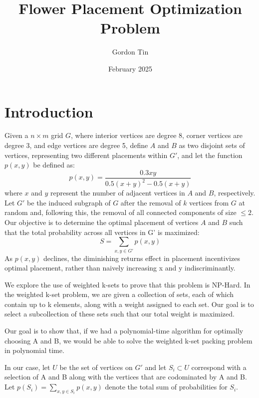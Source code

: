 \documentclass{article}
\title{Flower Placement Optimization Problem}
\author{Gordon Tin}
\date{February 2025}
\begin{document}
\maketitle

\section{Introduction}

Given a $n \times m$ grid $G$, where interior vertices are degree 8, corner vertices are degree 3, and edge vertices are degree 5, define $A$ and $B$ as two disjoint sets of vertices, representing two different placements within $G'$, and let the function $p(x,y)$ be defined as: 
\[p(x,y)= \frac{0.3xy}{0.5(x+y)^{2}-0.5(x+y)}\]
where $x$ and $y$ represent the number of adjacent vertices in $A$ and $B$, respectively. Let $G'$ be the induced subgraph of $G$ after the removal of $k$ vertices from $G$ at random and, following this, the removal of all connected components of size $\leq 2$.
Our objective is to determine the optimal placement of vertices $A$ and $B$ such that the total probability across all vertices in G' is maximized: \[S = \sum_{x,y \in G'} p(x,y)\] 
As \(p(x,y)\) declines, the diminishing returns effect in placement incentivizes optimal placement, rather than naively increasing x and y indiscriminantly. 

We explore the use of weighted k-sets to prove that this problem is NP-Hard. In the weighted k-set problem, we are given a collection of sets, each of which contain up to k elements, along with a weight assigned to each set. Our goal is to select a subcollection of these sets such that our total weight is maximized. 

Our goal is to show that, if we had a polynomial-time algorithm for optimally choosing A and B, we would be able to solve the weighted k-set packing problem in polynomial time. 

In our case, let $U$ be the set of vertices on $G'$ and let $S_i \subset U$ correspond with a selection of A and B along with the vertices that are codominated by A and B. Let $p(S_i) = \sum_{x,y \in S_i} p(x,y)$ denote the total sum of probabilities for $S_i$.
\end{document}
